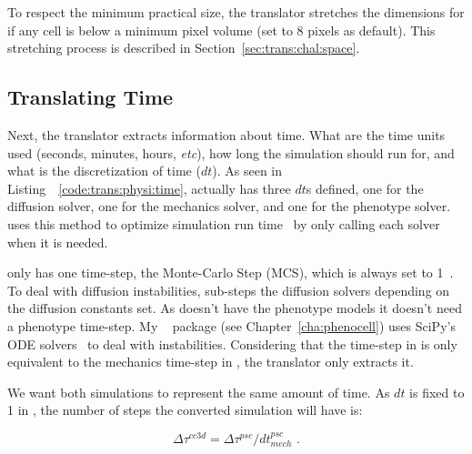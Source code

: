 To respect the minimum practical size, the translator stretches the dimensions for \ccds if any cell is below a minimum pixel volume (set to 8 pixels as default). This stretching process is described in Section~\ref{sec:trans:chal:space}.

\subsection{Translating Time}\label{sec:trans:impl:time}
Next, the translator extracts information about time. What are the time units used (seconds, minutes, hours, \textit{etc}), how long the simulation should run for, and what is the discretization of time ($dt$). As seen in Listing~~\ref{code:trans:physi:time}, \pscs actually has three $dt$s defined, one for the diffusion solver, one for the mechanics solver, and one for the phenotype solver. \pscs uses this method to optimize simulation run time~\cite{ghaffarizadeh_physicell_2018} by only calling each solver when it is needed.

\ccds only has one time-step, the Monte-Carlo Step (MCS), which is always set to 1~\cite{swat_multi-scale_2012}. To deal with diffusion instabilities, \ccds sub-steps the diffusion solvers depending on the diffusion constants set. As \ccds doesn't have the phenotype models it doesn't need a phenotype time-step. My \pcp~\cite{gianlupi_phenocellpy_2023} package (see Chapter~\ref{cha:phenocell}) uses SciPy's ODE solvers~\cite{2020SciPy-NMeth} to deal with instabilities. Considering that the time-step in \ccds is only equivalent to the mechanics time-step in \psc, the translator only extracts it. 

We want both simulations to represent the same amount of time. As $dt$ is fixed to 1 in \ccd, the number of steps the converted \ccds simulation will have is:

\begin{equation}\label{eq:trans:time:steps}
    \Delta\tau^{cc3d} = \Delta\tau^{psc}/dt^{psc}_{mech} \,\,.
\end{equation}


